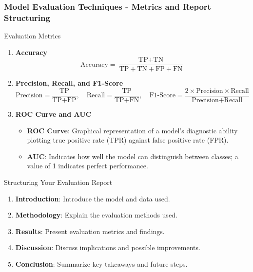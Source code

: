 \documentclass[aspectratio=169]{beamer}
\begin{document}
\begin{frame}[fragile]
    \frametitle{Model Evaluation Techniques - Metrics and Report Structuring}
    \begin{block}{Evaluation Metrics}
        \begin{enumerate}
            \item \textbf{Accuracy}
            \begin{equation}
                \text{Accuracy} = \frac{\text{TP} + \text{TN}}{\text{TP} + \text{TN} + \text{FP} + \text{FN}}
            \end{equation}
            \item \textbf{Precision, Recall, and F1-Score}
            \begin{equation}
                \text{Precision} = \frac{\text{TP}}{\text{TP} + \text{FP}}, \quad \text{Recall} = \frac{\text{TP}}{\text{TP} + \text{FN}}, \quad \text{F1-Score} = \frac{2 \times \text{Precision} \times \text{Recall}}{\text{Precision} + \text{Recall}}
            \end{equation}
            \item \textbf{ROC Curve and AUC}
            \begin{itemize}
                \item \textbf{ROC Curve}: Graphical representation of a model's diagnostic ability plotting true positive rate (TPR) against false positive rate (FPR).
                \item \textbf{AUC}: Indicates how well the model can distinguish between classes; a value of 1 indicates perfect performance.
            \end{itemize}
        \end{enumerate}
    \end{block}

    \begin{block}{Structuring Your Evaluation Report}
        \begin{enumerate}
            \item \textbf{Introduction}: Introduce the model and data used.
            \item \textbf{Methodology}: Explain the evaluation methods used.
            \item \textbf{Results}: Present evaluation metrics and findings.
            \item \textbf{Discussion}: Discuss implications and possible improvements.
            \item \textbf{Conclusion}: Summarize key takeaways and future steps.
        \end{enumerate}
    \end{block}
\end{frame}
\end{document}
